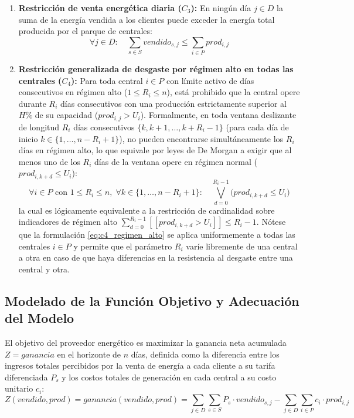 \begin{enumerate}
    \item \textbf{Restricción de venta energética diaria ($C_3$):} En ningún día $j \in D$ la suma de la energía vendida a los clientes puede exceder la energía total producida por el parque de centrales:
    \begin{equation}
        \forall j \in D: \quad \sum_{s \in S} vendido_{s,j} \le \sum_{i \in P} prod_{i,j}
        \label{eq:c3_balance}
    \end{equation}

    \item \textbf{Restricción generalizada de desgaste por régimen alto en todas las centrales ($C_4$):} Para toda central $i \in P$ con límite activo de días consecutivos en régimen alto ($1 \le R_i \le n$), está prohibido que la central opere durante $R_i$ días consecutivos con una producción estrictamente superior al $H\%$ de su capacidad ($prod_{i,j} > U_i$). Formalmente, en toda ventana deslizante de longitud $R_i$ días consecutivos $\{k, k+1, \dots, k + R_i - 1\}$ (para cada día de inicio $k \in \{1, \dots, n - R_i + 1\}$), no pueden encontrarse simultáneamente los $R_i$ días en régimen alto, lo que equivale por leyes de De Morgan a exigir que al menos uno de los $R_i$ días de la ventana opere en régimen normal ($prod_{i, k+d} \le U_i$):
    \begin{equation}
        \forall i \in P \text{ con } 1 \le R_i \le n, \; \forall k \in \{1, \dots, n - R_i + 1\}: \quad \bigvee_{d=0}^{R_i - 1} \big( prod_{i, k+d} \le U_i \big)
        \label{eq:c4_regimen_alto}
    \end{equation}
    la cual es lógicamente equivalente a la restricción de cardinalidad sobre indicadores de régimen alto $\sum_{d=0}^{R_i - 1} [\![ prod_{i, k+d} > U_i ]\!] \le R_i - 1$. Nótese que la formulación \eqref{eq:c4_regimen_alto} se aplica uniformemente a todas las centrales $i \in P$ y permite que el parámetro $R_i$ varíe libremente de una central a otra en caso de que haya diferencias en la resistencia al desgaste entre una central y otra.
\end{enumerate}

\subsection{Modelado de la Función Objetivo y Adecuación del Modelo}

El objetivo del proveedor energético es maximizar la ganancia neta acumulada $Z = ganancia$ en el horizonte de $n$ días, definida como la diferencia entre los ingresos totales percibidos por la venta de energía a cada cliente a su tarifa diferenciada $P_s$ y los costos totales de generación en cada central a su costo unitario $c_i$:
\begin{equation}
     Z(vendido, prod) = ganancia(vendido, prod) = \sum_{j \in D} \sum_{s \in S} P_s \cdot vendido_{s,j} - \sum_{j \in D} \sum_{i \in P} c_i \cdot prod_{i,j}
    \label{eq:funcion_objetivo}
\end{equation}

